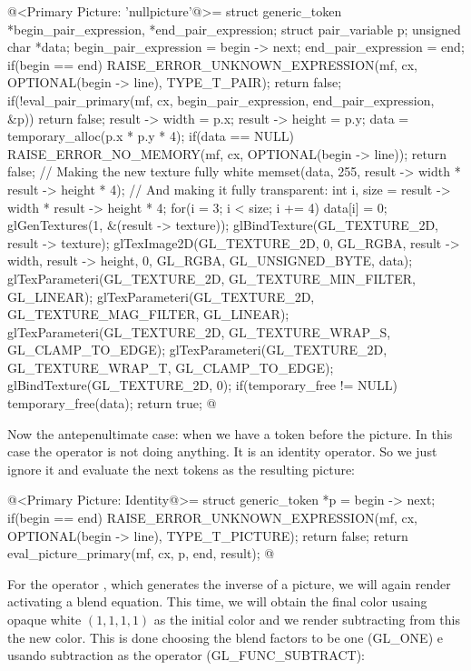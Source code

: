 {{{{{\iniciocodigo
@<Primary Picture: 'nullpicture'@>=
struct generic_token *begin_pair_expression, *end_pair_expression;
struct pair_variable p;
unsigned char *data;
begin_pair_expression = begin -> next;
end_pair_expression = end;
if(begin == end){
  RAISE_ERROR_UNKNOWN_EXPRESSION(mf, cx, OPTIONAL(begin -> line), TYPE_T_PAIR);
  return false;
}
if(!eval_pair_primary(mf, cx, begin_pair_expression, end_pair_expression, &p))
  return false;
result -> width = p.x;
result -> height = p.y;
data = temporary_alloc(p.x * p.y * 4);
if(data == NULL){
  RAISE_ERROR_NO_MEMORY(mf, cx, OPTIONAL(begin -> line));
  return false;
}
// Making the new texture fully white
memset(data, 255, result -> width * result -> height * 4);
{ // And making it fully transparent:
  int i, size = result -> width * result -> height * 4;
  for(i = 3; i < size; i += 4)
    data[i] = 0;
}
glGenTextures(1, &(result -> texture));
glBindTexture(GL_TEXTURE_2D, result -> texture);
glTexImage2D(GL_TEXTURE_2D, 0, GL_RGBA, result -> width, result -> height, 0,
             GL_RGBA, GL_UNSIGNED_BYTE, data);
glTexParameteri(GL_TEXTURE_2D, GL_TEXTURE_MIN_FILTER, GL_LINEAR);
glTexParameteri(GL_TEXTURE_2D, GL_TEXTURE_MAG_FILTER, GL_LINEAR);
glTexParameteri(GL_TEXTURE_2D, GL_TEXTURE_WRAP_S, GL_CLAMP_TO_EDGE);
glTexParameteri(GL_TEXTURE_2D, GL_TEXTURE_WRAP_T, GL_CLAMP_TO_EDGE);
glBindTexture(GL_TEXTURE_2D, 0);
if(temporary_free != NULL)
  temporary_free(data);
return true;
@
\fimcodigo

Now the antepenultimate case: when we have a token \monoespaco{+}
before the picture. In this case the operator is not doing
anything. It is an identity operator. So we just ignore it and
evaluate the next tokens as the resulting picture:

\iniciocodigo
@<Primary Picture: Identity@>=
struct generic_token *p = begin -> next;
if(begin == end){
  RAISE_ERROR_UNKNOWN_EXPRESSION(mf, cx, OPTIONAL(begin -> line),
                                 TYPE_T_PICTURE);
  return false;
}
return eval_picture_primary(mf, cx, p, end, result);
@
\fimcodigo

For the operator \monoespaco{-}, which generates the inverse of a
picture, we will again render activating a blend equation. This time,
we will obtain the final color usaing opaque white $(1, 1, 1, 1)$ as
the initial color and we render subtracting from this the new
color. This is done choosing the blend factors to be one (GL\_ONE) e
usando subtraction as the operator (GL\_FUNC\_SUBTRACT):

}}}}}
